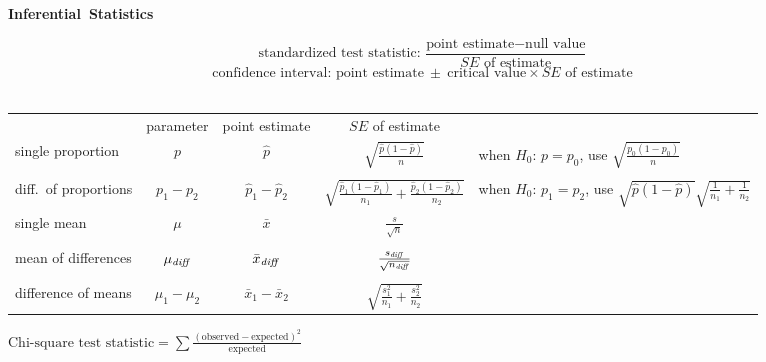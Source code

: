 \noindent%
\textbf{Inferential~Statistics} \vspace{4mm}

$$\text{standardized test statistic: }  \frac{\text{point estimate} - \text{null value}}{SE \text{ of estimate}}\qquad\ $$
$$\text{confidence interval: } \text{point estimate} \ \pm \ \text{critical value}\times SE \text{ of estimate}\qquad\ $$
\\[2mm]

\noindent%
\begin{tabular}{lcccl}
&parameter & point estimate &$SE$  of estimate& \\
single proportion &$p$ &$\hat{p}$ &$\sqrt{\frac{\hat{p}(1-\hat{p})}{n}}$ &
    {\footnotesize when $H_0$: $p=p_0$, use $\sqrt{\frac{p_0(1-p_0)}{n}}$} \\
\\
diff.~of proportions &
    $p_1-p_2$ & $\hat{p}_1-\hat{p}_2$ &
    $\sqrt{\frac{\hat{p}_1(1-\hat{p}_1)}{n_1}+
        \frac{\hat{p}_2(1-\hat{p}_2)}{n_2}}$ &
    {\footnotesize when $H_0$: $p_1=p_2$, use $\scriptscriptstyle{\sqrt{\hat{p}(1-\hat{p})}\sqrt{\frac{1}{n_1}+\frac{1}{n_2}}}$}
    \\
single mean & $\mu$ & $\bar{x}$ & $\frac{s}{\sqrt{n}}$&\quad  \\
\\
mean of differences& $\mu_{\text{\emph{diff}}}$ & $\bar{x}_{\text{\emph{diff}}}$ & $\frac{s_{\text{\emph{diff}}}}{\sqrt{n_{\text{\emph{diff}}}}}$&\quad  \\
\\
difference of means & $\mu_1-\mu_2$ & $\bar{x}_1-\bar{x}_2$ & $\sqrt{\frac{s^2_1}{n_1}+\frac{s^2_2}{n_2}}$&
\end{tabular}
\vspace{1cm}

\noindent%
$\text{Chi-square test statistic} = \sum{\frac{(\text{observed} - \text{expected})^2}{\text{expected}}}$
\restoregeometry